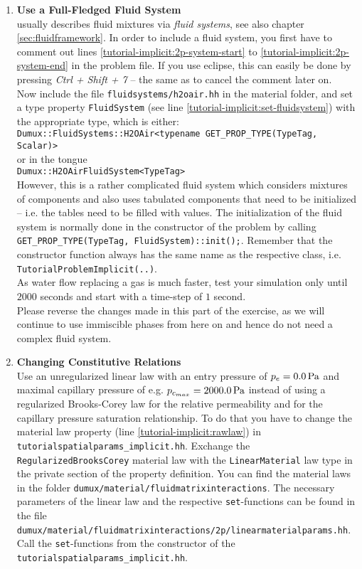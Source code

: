 \begin{enumerate}
\item \textbf{Use a Full-Fledged Fluid System} \\
\Dumux usually describes fluid mixtures via \textit{fluid systems}, see also chapter \ref{sec:fluidframework}.
In order to include a fluid system, you first have to comment out lines \ref{tutorial-implicit:2p-system-start}
to \ref{tutorial-implicit:2p-system-end} in the problem file. If you use eclipse,
this can easily be done by pressing \textit{Ctrl + Shift + 7} --
the same as to cancel the comment later on.\\
Now include the file \texttt{fluidsystems/h2oair.hh} in the material
folder, and set a type property \texttt{FluidSystem} (see line \ref{tutorial-implicit:set-fluidsystem})
with the appropriate type, which is either:\\
 \texttt{Dumux::FluidSystems::H2OAir<typename GET\_PROP\_TYPE(TypeTag, Scalar)>}\\
or in the \Dumux tongue\\
 \texttt{Dumux::H2OAirFluidSystem<TypeTag>}
\\
However, this is a rather complicated fluid system which
considers mixtures of components and also uses tabulated components that need to
be initialized -- i.e. the tables need to be filled with values.
The initialization of the fluid system is normally done in the constructor of the
problem by calling \texttt{GET\_PROP\_TYPE(TypeTag, FluidSystem)::init();}.
Remember that the constructor function always has the same name as the respective
class, i.e. \texttt{TutorialProblemImplicit(..)}.\\
As water flow replacing a gas is much faster, test your simulation only until $2000$
seconds and start with a time-step of $1$ second.\\
Please reverse the changes made in this part of the exercise, as we will continue
to use immiscible phases from here on and hence do not need a complex fluid system.

\item \textbf{Changing Constitutive Relations} \\
Use an unregularized linear law with an entry pressure of $p_e = \unit[0.0]{Pa}$
and maximal capillary pressure of e.g. $p_{c_{max}} = \unit[2000.0]{Pa}$ instead of using a
 regularized Brooks-Corey law for the
  relative permeability and for the capillary pressure saturation relationship.
  To do that you have
  to change the material law property (line \ref{tutorial-implicit:rawlaw}) in
  \texttt{tutorialspatialparams\_implicit.hh}. Exchange the \texttt{RegularizedBrooksCorey} material law with the \texttt{LinearMaterial} law type in the private section of
 the property definition.
 You can find the material laws in the folder
  \verb+dumux/material/fluidmatrixinteractions+. The necessary parameters
of the linear law and the respective \texttt{set}-functions can be found
 in the file \\
 \verb+dumux/material/fluidmatrixinteractions/2p/linearmaterialparams.hh+.\\
Call the \texttt{set}-functions from the constructor of the \texttt{tutorialspatialparams\_implicit.hh}.


\end{enumerate}
